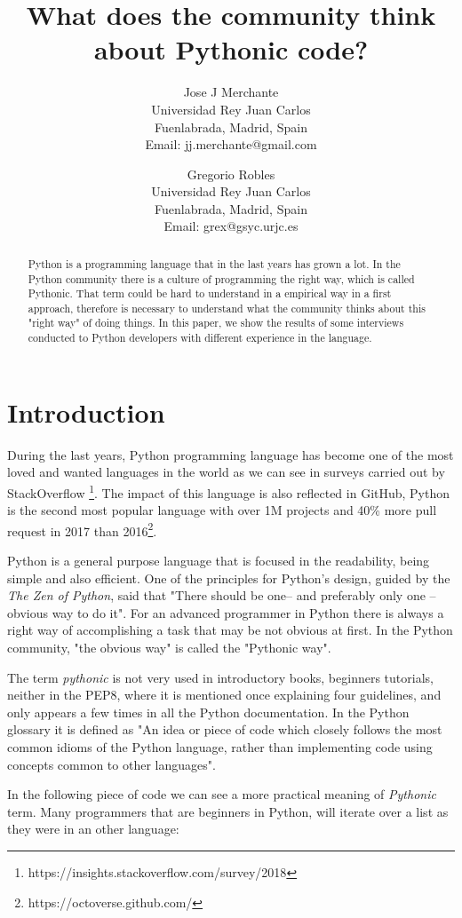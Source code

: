 \documentclass[a4paper]{article}
\title{What does the community think about Pythonic code?}
\author{
Jose J Merchante \\ 
Universidad Rey Juan Carlos\\
Fuenlabrada, Madrid, Spain\\
Email: jj.merchante@gmail.com
\and
Gregorio Robles \\
Universidad Rey Juan Carlos\\
Fuenlabrada, Madrid, Spain\\
Email: grex@gsyc.urjc.es
}
\begin{document}
\maketitle

\begin{abstract}
Python is a programming language that in the last years has grown a lot. In the Python community there is a culture of programming the right way, which is called Pythonic. That term could be hard to understand in a empirical way in a first approach, therefore is necessary to understand what the community thinks about this "right way" of doing things. In this paper, we show the results of some interviews conducted to Python developers with different experience in the language.

\end{abstract}


\section{Introduction}

During the last years, Python programming language has become one of the most loved and wanted languages in the world as we can see in surveys carried out by StackOverflow \footnote{https://insights.stackoverflow.com/survey/2018}. The impact of this language is also reflected in GitHub, Python is the second most popular language with over 1M projects and 40\% more pull request in 2017 than 2016\footnote{https://octoverse.github.com/}. 

Python is a general purpose language that is focused in the readability, being simple and also efficient. One of the principles for Python's design, guided by the \textit{The Zen of Python}, said that "There should be one-- and preferably only one --obvious way to do it". For an advanced programmer in Python there is always a right way of accomplishing a task that may be not obvious at first. In the Python community, "the obvious way" is called the "Pythonic way".

The term \textit{pythonic} is not very used in introductory books, beginners tutorials, neither in the PEP8, where it is mentioned once explaining four guidelines, and only appears a few times in all the Python documentation. In the Python glossary it is defined as "An idea or piece of code which closely follows the most common idioms of the Python language, rather than implementing code using concepts common to other languages".

In the following piece of code we can see a more practical meaning of \textit{Pythonic} term. Many programmers that are beginners in Python, will iterate over a list as they were in an other language:
\end{document}
